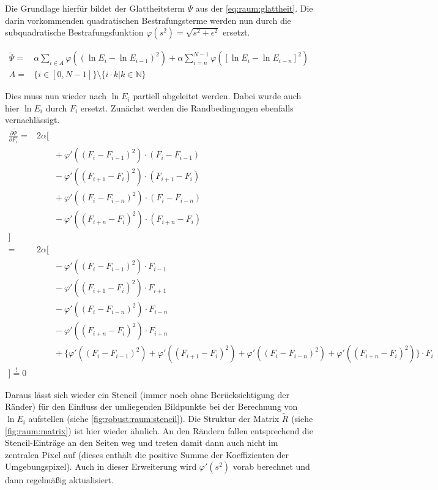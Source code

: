 Die Grundlage hierfür bildet der Glattheitsterm $\Psi$ aus der \autoref{eq:raum:glattheit}. Die darin vorkommenden quadratischen Bestrafungsterme werden nun durch die subquadratische Bestrafungsfunktion $\varphi(s^2) = \sqrt{s^2+\epsilon^2}$ ersetzt.

\begin{align}
\label{eq:robust:raum}
\tilde{\Psi} =& 
        \alpha \sum_{i\in A}
            \varphi((\ln E_i - \ln E_{i-1})^2)
        +\alpha \sum_{i=n}^{N-1}\varphi([\ln E_i - \ln E_{i-n}]^2)\\
    A=& \{ i \in [0,N-1]\} \setminus \{ i \cdot k | k \in \mathbb{N} \}
\end{align}

Dies muss nun wieder nach $\ln E_i$ partiell abgeleitet werden. Dabei wurde auch hier $\ln E_i$ durch $F_i$ ersetzt. Zunächst werden die Randbedingungen ebenfalls vernachlässigt.
\begin{align}
\frac{\partial \tilde \Psi}{\partial F_i} =& 2\alpha[ \nonumber\\
    & \qquad + \varphi'((F_i - F_{i-1})^2)     \cdot (F_i - F_{i-1}) \nonumber\\
    & \qquad - \varphi'((F_{i+1} - F_{i})^2)   \cdot (F_{i+1} - F_i) \nonumber\\
    & \qquad + \varphi'((F_i - F_{i-n})^2)     \cdot (F_i - F_{i-n})\nonumber\\
    & \qquad - \varphi'((F_{i+n} - F_{i})^2)   \cdot (F_{i+n}- F_i)\nonumber\\
    ]\\
=& 2\alpha[ \nonumber\\
    & \qquad - \varphi'((F_i - F_{i-1})^2)     \cdot F_{i-1} \nonumber\\
    & \qquad - \varphi'((F_{i+1} - F_{i})^2)   \cdot F_{i+1} \nonumber\\
    & \qquad - \varphi'((F_i - F_{i-n})^2)     \cdot F_{i-n} \nonumber\\
    & \qquad - \varphi'((F_{i+n} - F_{i})^2)   \cdot F_{i+n} \nonumber\\
    & \qquad + \{\varphi'((F_i - F_{i-1})^2) + \varphi'((F_{i+1} - F_{i})^2) +\varphi'((F_i - F_{i-n})^2) + \varphi'((F_{i+n} - F_{i})^2)\} \cdot F_i \nonumber\\
    ] \overset{!}{=} 0
\end{align}

Daraus lässt sich wieder ein Stencil (immer noch ohne Berücksichtigung der Ränder) für den Einfluss der umliegenden Bildpunkte bei der Berechnung von $\ln E_i$ aufstellen (siehe \autoref{fig:robust:raum:stencil}). Die Struktur der Matrix $\tilde R$ (siehe \autoref{fig:raum:matrix}) ist hier wieder ähnlich. An den Rändern fallen entsprechend die Stencil-Einträge an den Seiten weg und treten damit dann auch nicht im zentralen Pixel auf (dieses enthält die positive Summe der Koeffizienten der Umgebungspixel). Auch in dieser Erweiterung wird $\varphi'(s^2)$ vorab berechnet und dann regelmäßig aktualisiert.

